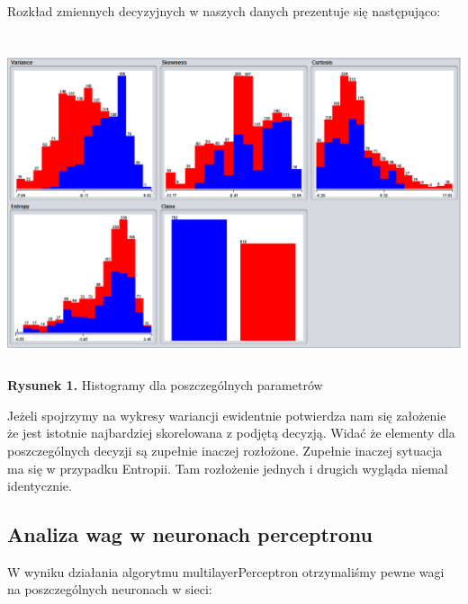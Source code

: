 \documentclass{classrep}
\begin{document}
Rozkład zmiennych decyzyjnych w naszych danych prezentuje się następująco:
\begin{center}
	\includegraphics[height=10cm]{rozklad_parametrow.png}
	\textbf{Rysunek 1.} Histogramy dla poszczególnych parametrów
\end{center}

Jeżeli spojrzymy na wykresy wariancji ewidentnie potwierdza nam się założenie że jest istotnie najbardziej skorelowana z podjętą decyzją. Widać że elementy dla poszczególnych decyzji są zupełnie inaczej rozłożone. Zupełnie inaczej sytuacja ma się w przypadku Entropii. Tam rozłożenie jednych i drugich wygląda niemal identycznie.

\subsection{Analiza wag w neuronach perceptronu}
W wyniku działania algorytmu multilayerPerceptron otrzymaliśmy pewne wagi na poszczególnych neuronach w sieci:
\end{document}

